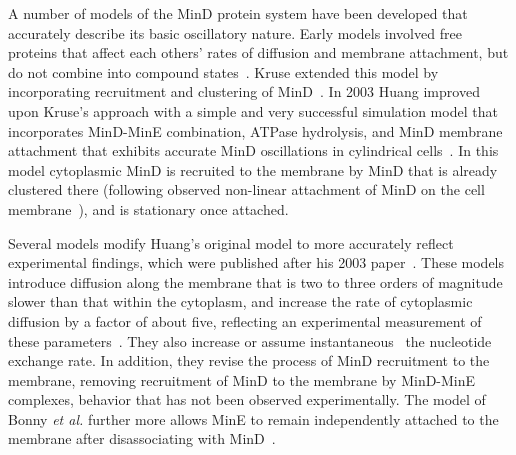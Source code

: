\documentclass[10pt,letterpaper]{article}
\begin{document}
A number of models of the MinD protein system have been developed that
accurately describe its basic oscillatory nature.
%
Early models involved free proteins that affect each others' rates of
diffusion and membrane attachment, but do not combine into compound
states~\cite{meinhardt2001pattern}.  Kruse extended this model by
incorporating recruitment and clustering of
MinD~\cite{kruse2002dynamic}.  In 2003 Huang improved upon Kruse's
approach with a simple and very successful simulation model that
incorporates MinD-MinE combination, ATPase hydrolysis, and MinD
membrane attachment that exhibits accurate MinD oscillations in
cylindrical cells~\cite{huang2003dynamic}. In this model cytoplasmic
MinD is recruited to the membrane by MinD that is already clustered
there (following observed non-linear attachment of MinD on the cell
membrane~\cite{hu2002dynamic,shih2002division}), and is stationary
once attached.
%

Several models \cite{bonny2013membrane,
  halatek2012highly} modify Huang's original model to more accurately
reflect experimental findings, which were published after his 2003
paper~\cite{meacci2006mobility, loose2011min}. These models introduce
diffusion along the membrane that is two to three orders of magnitude
slower than that within the cytoplasm, and increase the rate of
cytoplasmic diffusion by a factor of about five, reflecting an
experimental measurement of these
parameters~\cite{meacci2006mobility}.  They also increase
or assume instantaneous~\cite{bonny2013membrane} the nucleotide
exchange rate.  In addition, they revise the process of MinD
recruitment to the membrane, removing recruitment of MinD to the
membrane by MinD-MinE complexes, behavior that has not been observed
experimentally.  The model of Bonny \emph{et al.} further more allows
MinE to remain independently attached to the membrane after
disassociating with MinD~\cite{bonny2013membrane}.
%
\end{document}
